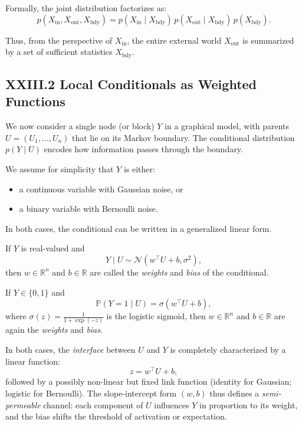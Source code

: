 \documentclass[11pt,letterpaper]{article}
\begin{document}
Formally, the joint distribution factorizes as:
\[
p(X_{\text{in}}, X_{\text{out}}, X_{\text{bdy}})
= p(X_{\text{in}} \mid X_{\text{bdy}})\, p(X_{\text{out}} \mid X_{\text{bdy}})\, p(X_{\text{bdy}}).
\]

Thus, from the perspective of $X_{\text{in}}$, the entire external world $X_{\text{out}}$ is summarized by a set of sufficient statistics $X_{\text{bdy}}$.

\subsection{XXIII.2 Local Conditionals as Weighted Functions}

We now consider a single node (or block) $Y$ in a graphical model, with parents $U = (U_1, \dots, U_n)$ that lie on its Markov boundary. The conditional distribution $p(Y \mid U)$ encodes how information passes through the boundary.

We assume for simplicity that $Y$ is either:

\begin{itemize}
  \item a continuous variable with Gaussian noise, or
  \item a binary variable with Bernoulli noise.
\end{itemize}

In both cases, the conditional can be written in a generalized linear form.

\begin{definition}
If $Y$ is real-valued and
\[
Y \mid U \sim \mathcal{N}(w^\top U + b, \sigma^2),
\]
then $w \in \mathbb{R}^n$ and $b \in \mathbb{R}$ are called the \emph{weights} and \emph{bias} of the conditional.
\end{definition}

\begin{definition}
If $Y \in \{0,1\}$ and
\[
\mathbb{P}(Y=1 \mid U) = \sigma(w^\top U + b),
\]
where $\sigma(z) = \frac{1}{1+\exp(-z)}$ is the logistic sigmoid, then $w \in \mathbb{R}^n$ and $b \in \mathbb{R}$ are again the \emph{weights} and \emph{bias}.
\end{definition}

In both cases, the \emph{interface} between $U$ and $Y$ is completely characterized by a linear function:
\[
z = w^\top U + b,
\]
followed by a possibly non-linear but fixed link function (identity for Gaussian; logistic for Bernoulli). The slope-intercept form $(w, b)$ thus defines a \emph{semi-permeable} channel: each component of $U$ influences $Y$ in proportion to its weight, and the bias shifts the threshold of activation or expectation.
\end{document}

